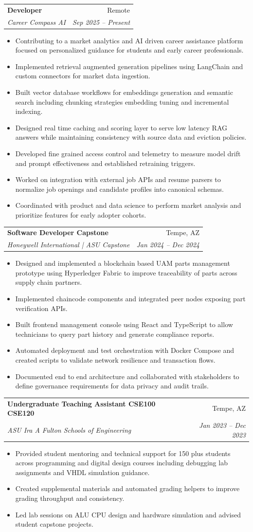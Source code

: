 \documentclass[letterpaper,10pt]{article}
\makeatletter
\newcommand{\resumeItem}[1]{
  \item\small{{#1 \vspace{-2pt}}}
}
\newcommand{\resumeSubheading}[4]{
  \vspace{-2pt}\item
    \begin{tabular*}{0.97\textwidth}[t]{l@{\extracolsep{\fill}}r}
      \textbf{#1} & #2 \\
      \textit{\small#3} & \textit{\small #4} \\
    \end{tabular*}\vspace{-7pt}
}
\newcommand{\resumeItemListStart}{\begin{itemize}}
\newcommand{\resumeItemListEnd}{\end{itemize}\vspace{-5pt}}
\makeatother
\begin{document}
      \resumeSubheading
      {Developer}{Remote}
      {Career Compass AI}{Sep 2025 -- Present}
      \resumeItemListStart
        \resumeItem{Contributing to a market analytics and AI driven career assistance platform focused on personalized guidance for students and early career professionals.}
        \resumeItem{Implemented retrieval augmented generation pipelines using LangChain and custom connectors for market data ingestion.}
        \resumeItem{Built vector database workflows for embeddings generation and semantic search including chunking strategies embedding tuning and incremental indexing.}
        \resumeItem{Designed real time caching and scoring layer to serve low latency RAG answers while maintaining consistency with source data and eviction policies.}
        \resumeItem{Developed fine grained access control and telemetry to measure model drift and prompt effectiveness and established retraining triggers.}
        \resumeItem{Worked on integration with external job APIs and resume parsers to normalize job openings and candidate profiles into canonical schemas.}
        \resumeItem{Coordinated with product and data science to perform market analysis and prioritize features for early adopter cohorts.}
      \resumeItemListEnd


    \resumeSubheading
      {Software Developer Capstone}{Tempe, AZ}
      {Honeywell International | ASU Capstone}{Jan 2024 -- Dec 2024}
      \resumeItemListStart
        \resumeItem{Designed and implemented a blockchain based UAM parts management prototype using Hyperledger Fabric to improve traceability of parts across supply chain partners.}
        \resumeItem{Implemented chaincode components and integrated peer nodes exposing part verification APIs.}
        \resumeItem{Built frontend management console using React and TypeScript to allow technicians to query part history and generate compliance reports.}
        \resumeItem{Automated deployment and test orchestration with Docker Compose and created scripts to validate network resilience and transaction flows.}
        \resumeItem{Documented end to end architecture and collaborated with stakeholders to define governance requirements for data privacy and audit trails.}
      \resumeItemListEnd

    \resumeSubheading
      {Undergraduate Teaching Assistant CSE100 CSE120}{Tempe, AZ}
      {ASU Ira A Fulton Schools of Engineering}{Jan 2023 -- Dec 2023}
      \resumeItemListStart
        \resumeItem{Provided student mentoring and technical support for 150 plus students across programming and digital design courses including debugging lab assignments and VHDL simulation guidance.}
        \resumeItem{Created supplemental materials and automated grading helpers to improve grading throughput and consistency.}
        \resumeItem{Led lab sessions on ALU CPU design and hardware simulation and advised student capstone projects.}
      \resumeItemListEnd
\end{document}

